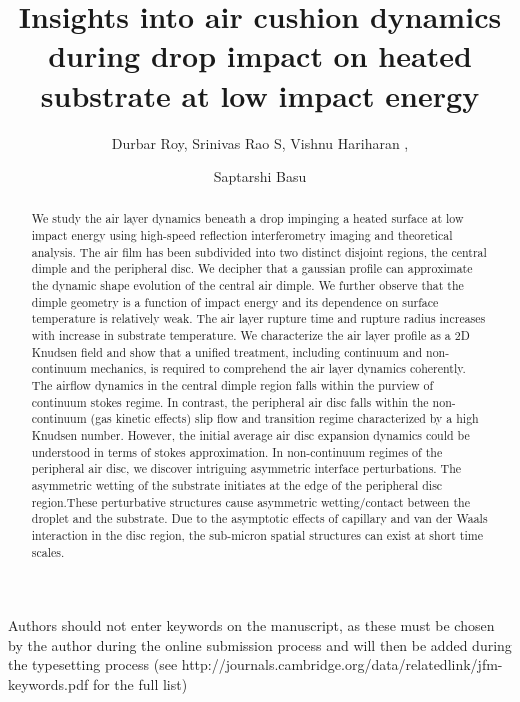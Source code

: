 \documentclass{jfm}
\title{Insights into air cushion dynamics during drop impact on heated substrate at low impact energy}
\author{Durbar Roy\aff{1},
Srinivas Rao S\aff{1},
Vishnu Hariharan \aff{1},
\and Saptarshi Basu\aff{1}
  \corresp{\email{sbasu@iisc.ac.in}}}
\affiliation{
\aff{1}Department of Mechanical Engineering, Indian Institute of Science, Bengaluru, 560012, India
}
\begin{document}
\maketitle

\begin{abstract}
We study the air layer dynamics beneath a drop impinging a heated surface at low impact energy using high-speed reflection interferometry imaging and theoretical analysis. The air film has been subdivided into two distinct disjoint regions, the central dimple and the peripheral disc. We decipher that a gaussian profile can approximate the dynamic shape evolution of the central air dimple. We further observe that the dimple geometry is a function of impact energy and its dependence on surface temperature is relatively weak. The air layer rupture time and rupture radius increases with increase in substrate temperature. We characterize the air layer profile as a 2D Knudsen field and show that a unified treatment, including continuum and non-continuum mechanics, is required to comprehend the air layer dynamics coherently. The airflow dynamics in the central dimple region falls within the purview of continuum stokes regime. In contrast, the peripheral air disc falls within the non-continuum (gas kinetic effects) slip flow and transition regime characterized by a high Knudsen number. However, the initial average air disc expansion dynamics could be understood in terms of stokes approximation. In non-continuum regimes of the peripheral air disc, we discover intriguing asymmetric interface perturbations. The asymmetric wetting of the substrate initiates at the edge of the peripheral disc region.These perturbative structures cause asymmetric wetting/contact between the droplet and the substrate. Due to the asymptotic effects of capillary and van der Waals interaction in the disc region, the sub-micron spatial structures can exist at short time scales.
\end{abstract}

\begin{keywords}
Authors should not enter keywords on the manuscript, as these must be chosen by the author during the online submission process and will then be added during the typesetting process (see http://journals.cambridge.org/data/\linebreak[3]relatedlink/jfm-\linebreak[3]keywords.pdf for the full list)
\end{keywords}
\end{document}
